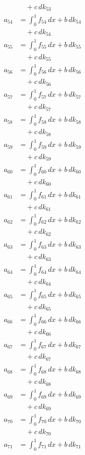 \documentclass{article}
\begin{document}
\begin{align}
&\quad + c\,dk_{53} \\
a_{54} &= \int_0^1 f_{54}\,dx + b\,dk_{54} \\
&\quad + c\,dk_{54} \\
a_{55} &= \int_0^1 f_{55}\,dx + b\,dk_{55} \\
&\quad + c\,dk_{55} \\
a_{56} &= \int_0^1 f_{56}\,dx + b\,dk_{56} \\
&\quad + c\,dk_{56} \\
a_{57} &= \int_0^1 f_{57}\,dx + b\,dk_{57} \\
&\quad + c\,dk_{57} \\
a_{58} &= \int_0^1 f_{58}\,dx + b\,dk_{58} \\
&\quad + c\,dk_{58} \\
a_{59} &= \int_0^1 f_{59}\,dx + b\,dk_{59} \\
&\quad + c\,dk_{59} \\
a_{60} &= \int_0^1 f_{60}\,dx + b\,dk_{60} \\
&\quad + c\,dk_{60} \\
a_{61} &= \int_0^1 f_{61}\,dx + b\,dk_{61} \\
&\quad + c\,dk_{61} \\
a_{62} &= \int_0^1 f_{62}\,dx + b\,dk_{62} \\
&\quad + c\,dk_{62} \\
a_{63} &= \int_0^1 f_{63}\,dx + b\,dk_{63} \\
&\quad + c\,dk_{63} \\
a_{64} &= \int_0^1 f_{64}\,dx + b\,dk_{64} \\
&\quad + c\,dk_{64} \\
a_{65} &= \int_0^1 f_{65}\,dx + b\,dk_{65} \\
&\quad + c\,dk_{65} \\
a_{66} &= \int_0^1 f_{66}\,dx + b\,dk_{66} \\
&\quad + c\,dk_{66} \\
a_{67} &= \int_0^1 f_{67}\,dx + b\,dk_{67} \\
&\quad + c\,dk_{67} \\
a_{68} &= \int_0^1 f_{68}\,dx + b\,dk_{68} \\
&\quad + c\,dk_{68} \\
a_{69} &= \int_0^1 f_{69}\,dx + b\,dk_{69} \\
&\quad + c\,dk_{69} \\
a_{70} &= \int_0^1 f_{70}\,dx + b\,dk_{70} \\
&\quad + c\,dk_{70} \\
a_{71} &= \int_0^1 f_{71}\,dx + b\,dk_{71} \\

\end{align}
\end{document}
